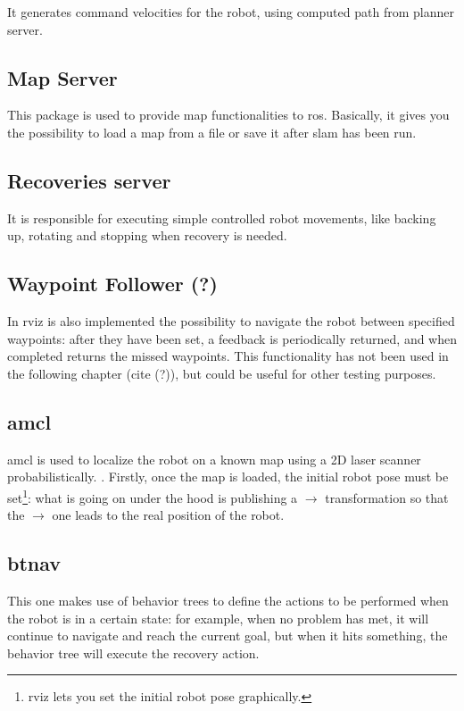 It generates command velocities for the robot, using computed path from planner server.

\subsection*{Map Server}

This package is used to provide map functionalities to \Acrshort{ros}. Basically, it gives you the possibility to load a map from a file or save it after \Acrfull{slam} has been run.

\subsection*{Recoveries server}

It is responsible for executing simple controlled robot movements, like backing up, rotating and stopping when recovery is needed.

\subsection*{Waypoint Follower (?)} 

In \Acrshort{rviz} is also implemented the possibility to navigate the robot between specified waypoints: after they have been set, a feedback is periodically returned, and when completed returns the missed waypoints. This functionality has not been used in the following chapter (cite (?)), but could be useful for other testing purposes.

\subsection*{\Acrfull{amcl}}

\Acrshort{amcl} is used to localize the robot on a known map using a 2D laser scanner probabilistically.
. Firstly, once the map is loaded, the initial robot pose must be set\footnote{\Acrshort{rviz} lets you set the initial robot pose graphically.}: what is going on under the hood is publishing a  $\rightarrow$  transformation so that the  $\rightarrow$  one leads to the real position of the robot.

\subsection*{\Acrfull{btnav}}

This one makes use of behavior trees to define the actions to be performed when the robot is in a certain state: for example, when no problem has met, it will continue to navigate and reach the current goal, but when it hits something, the behavior tree will execute the recovery action.

